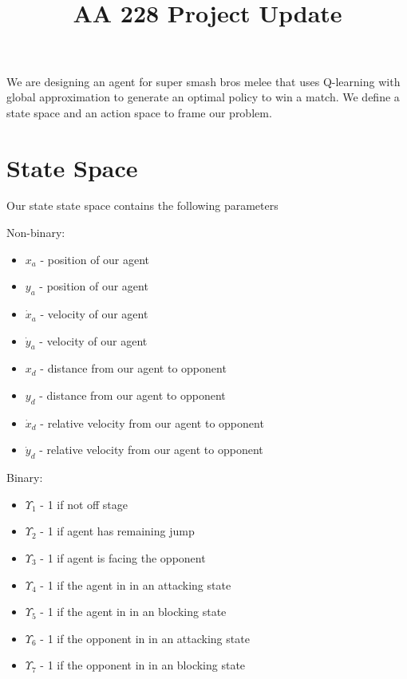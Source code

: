 \documentclass[11pt]{article}
\title{\vspace{-50pt}
\Huge \name
\\\vspace{20pt}
\huge AA 228 \hfill Project Update}
\author{}
\date{}
\theoremstyle{quest}
\begin{document}
\maketitle

We are designing an agent for super smash bros melee that uses Q-learning with global approximation to generate an optimal policy to win a match. We define a state space and an action space to frame our problem.

\vspace{2mm}

\section{State Space}
Our state state space contains the following parameters 

\vspace{2mm}

Non-binary:
\begin{itemize}
\item $x_{a}$ - position of our agent
\item $y_{a}$ - position of our agent
\item $\dot{x}_{a}$ - velocity of our agent
\item $\dot{y}_{a}$ - velocity of our agent
\item $x_{d}$ - distance from our agent to opponent 
\item $y_{d}$ - distance from our agent to opponent 
\item $\dot{x}_{d}$ - relative velocity from our agent to opponent
\item $\dot{y}_{d}$ - relative velocity from our agent to opponent
\end{itemize}

\vspace{2mm}

Binary:
\begin{itemize}
\item $\Upsilon_{1}$ - 1 if not off stage
\item $\Upsilon_{2}$ - 1 if agent has remaining jump
\item $\Upsilon_{3}$ - 1 if agent is facing the opponent
\item $\Upsilon_{4}$ - 1 if the agent in in an attacking state
\item $\Upsilon_{5}$ - 1 if the agent in in an blocking state
\item $\Upsilon_{6}$ - 1 if the opponent in in an attacking state
\item $\Upsilon_{7}$ - 1 if the opponent in in an blocking state
\end{itemize}
\end{document}
